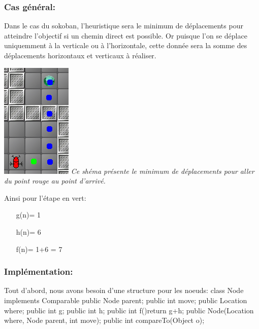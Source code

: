 \documentclass{article}
\begin{document}
\subsubsection{Cas général:}
Dans le cas du sokoban, l'heuristique sera le minimum  de déplacements pour atteindre l'objectif si un chemin direct est possible. Or puisque l'on se déplace uniquemment à la verticale ou à l'horizontale, cette donnée sera la somme des déplacements horizontaux et verticaux à réaliser.
\begin{center}
\includegraphics[scale=1]{img/heuristic.png} \newline
\textit{Ce shéma présente le minimum de déplacements pour aller du point rouge au point d'arrivé.}
\end{center}
Ainsi pour l'étape en vert:
\begin{itemize}
\item[g(n)= 1]
\item[h(n)= 6]
\item[f(n)= 1+6 = 7]
\end{itemize}
\subsubsection{Implémentation:}
Tout d'abord, nous avons besoin d'une structure pour les noeuds: \newpage
class Node implements Comparable {\newline
public Node parent;\newline
public int move;\newline
public Location where;\newline
public int g;\newline
public int h;\newline
public int f(){return g+h;}\newline
public Node(Location where, Node parent, int move);\newline
public int compareTo(Object o);\newline
}\newline
\end{document}
